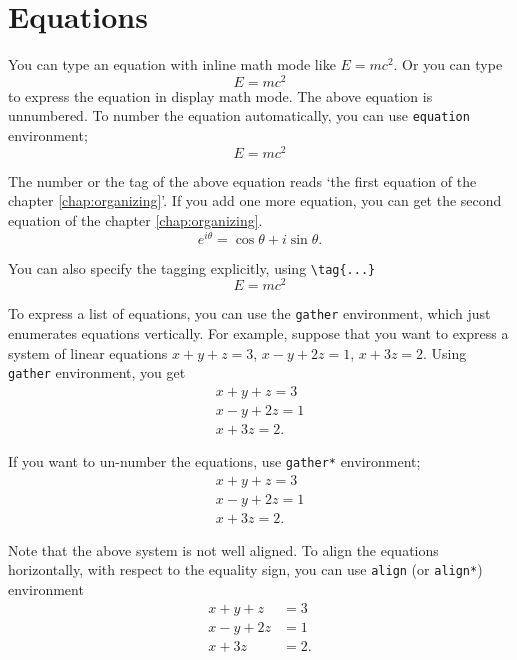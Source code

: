 \section{Equations}\label{sec:equation}

You can type an equation with inline math mode like \(E=mc^2\). %
Or you can type
\[E=mc^2\]
to express the equation in display math mode.
The above equation is unnumbered.
To number the equation automatically, you can use \texttt{equation} environment;
\begin{equation}
E=mc^2
\end{equation}

The number or the tag of the above equation reads `the first equation of the chapter \ref{chap:organizing}'.
If you add one more equation, you can get the second equation of the chapter \ref{chap:organizing}.
\begin{equation}
e^{i\theta}=\cos\theta+i\sin\theta.
\end{equation}

You can also specify the tagging explicitly, using \verb|\tag{...}|
\[E=mc^2\tag{$*$}\]

To express a list of equations, you can use the \texttt{gather} environment, which just enumerates equations vertically.
For example, suppose that you want to express a system of linear equations \(x+y+z=3\), \(x-y+2z=1\), \(x+3z=2\).
Using \texttt{gather} environment, you get
\begin{gather}
x+y+z=3\\
x-y+2z=1\\
x+3z=2.
\end{gather}

If you want to un-number the equations, use \texttt{gather*} environment;
\begin{gather*}
x+y+z=3\\
x-y+2z=1\\
x+3z=2.
\end{gather*}

Note that the above system is not well aligned.
To align the equations horizontally, with respect to the equality sign, you can use \texttt{align} (or \texttt{align*}) environment
\begin{align*}
x+y+z&=3\\
x-y+2z&=1\\
x+3z&=2.
\end{align*}

